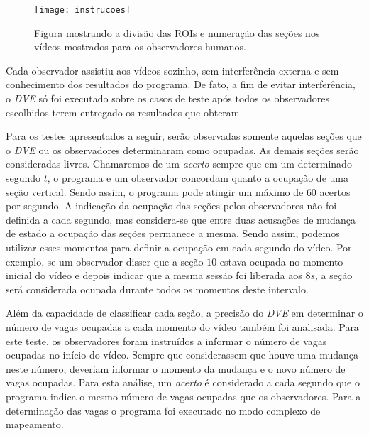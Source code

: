 \begin{figure}
\centering
\texttt{[image: instrucoes]}
\centering
\caption{Figura mostrando a divisão das ROIs e numeração das seções nos vídeos mostrados para os observadores humanos.}
\label{fig:instrucao}
\end{figure}

Cada observador assistiu aos vídeos sozinho, sem interferência externa e sem conhecimento dos resultados do programa. De fato, a fim de evitar interferência, o \textit{DVE} só foi executado sobre os casos de teste após todos os observadores escolhidos terem entregado os resultados que obteram.

Para os testes apresentados a seguir, serão observadas somente aquelas seções que o \textit{DVE} ou os observadores determinaram como ocupadas. As demais seções serão consideradas livres. Chamaremos de um \textit{acerto} sempre que em um determinado segundo $t$, o programa e um observador concordam quanto a ocupação de uma seção vertical. Sendo assim, o programa pode atingir um máximo de $60$ acertos por segundo. A indicação da ocupação das seções pelos observadores não foi definida a cada segundo, mas considera-se que entre duas acusações de mudança de estado a ocupação das seções permanece a mesma. Sendo assim, podemos utilizar esses momentos para definir a ocupação em cada segundo do vídeo. Por exemplo, se um observador disser que a seção $10$ estava ocupada no momento inicial do vídeo e depois indicar que a mesma sessão foi liberada aos $8s$, a seção será considerada ocupada durante todos os momentos deste intervalo. 

Além da capacidade de classificar cada seção, a precisão do \textit{DVE} em determinar o número de vagas ocupadas a cada momento do vídeo também foi analisada. Para este teste, os observadores foram instruídos a informar o número de vagas ocupadas no início do vídeo. Sempre que considerassem que houve uma mudança neste número, deveriam informar o momento da mudança e o novo número de vagas ocupadas. Para esta análise, um \textit{acerto} é considerado a cada segundo que o programa indica o mesmo número de vagas ocupadas que os observadores. Para a determinação das vagas o programa foi executado no modo complexo de mapeamento.

